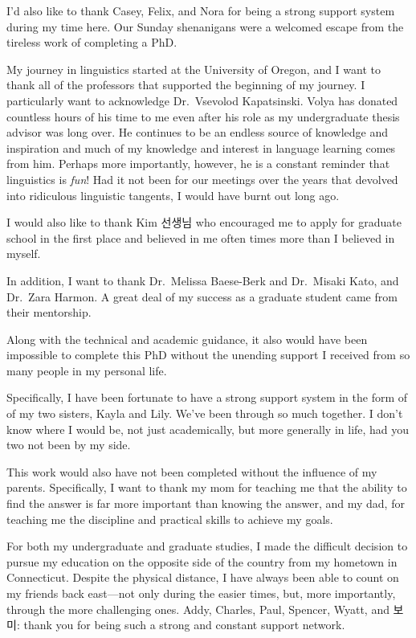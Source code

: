 \documentclass[
  12pt,
  letterpaper,
]{scrreprt}
\begin{document}
I'd also like to thank Casey, Felix, and Nora for being a strong support
system during my time here. Our Sunday shenanigans were a welcomed
escape from the tireless work of completing a PhD.

My journey in linguistics started at the University of Oregon, and I
want to thank all of the professors that supported the beginning of my
journey. I particularly want to acknowledge Dr.~Vsevolod Kapatsinski.
Volya has donated countless hours of his time to me even after his role
as my undergraduate thesis advisor was long over. He continues to be an
endless source of knowledge and inspiration and much of my knowledge and
interest in language learning comes from him. Perhaps more importantly,
however, he is a constant reminder that linguistics is \emph{fun}! Had
it not been for our meetings over the years that devolved into
ridiculous linguistic tangents, I would have burnt out long ago.

I would also like to thank Kim 선생님 who encouraged me to apply for
graduate school in the first place and believed in me often times more
than I believed in myself.

In addition, I want to thank Dr.~Melissa Baese-Berk and Dr.~Misaki Kato,
and Dr.~Zara Harmon. A great deal of my success as a graduate student
came from their mentorship.

Along with the technical and academic guidance, it also would have been
impossible to complete this PhD without the unending support I received
from so many people in my personal life.

Specifically, I have been fortunate to have a strong support system in
the form of of my two sisters, Kayla and Lily. We've been through so
much together. I don't know where I would be, not just academically, but
more generally in life, had you two not been by my side.

This work would also have not been completed without the influence of my
parents. Specifically, I want to thank my mom for teaching me that the
ability to find the answer is far more important than knowing the
answer, and my dad, for teaching me the discipline and practical skills
to achieve my goals.

For both my undergraduate and graduate studies, I made the difficult
decision to pursue my education on the opposite side of the country from
my hometown in Connecticut. Despite the physical distance, I have always
been able to count on my friends back east---not only during the easier
times, but, more importantly, through the more challenging ones. Addy,
Charles, Paul, Spencer, Wyatt, and 보미: thank you for being such a
strong and constant support network.
\end{document}
